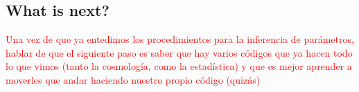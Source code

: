 \documentclass[onecolumn,           %
               showpacs,            %
               preprintnumbers,     %
               aps,                 %
               prl,          	    %
               letterpaper,             %
               superscriptaddress,      %
               nofootinbib,         %
               tightenlines,        %
               floats,floatfix      %
               ,usenatbib,
               ]{revtex4-1}
\begin{document}
\subsection{What is next?}

\textcolor{red}{Una vez de que ya entedimos los procedimientos para la inferencia de par\'ametros, hablar de que el siguiente paso es saber que hay varios c\'odigos que ya hacen todo lo que vimos (tanto la cosmolog\'ia, como la estad\'istica) y que es mejor aprender a moverles que andar haciendo nuestro propio código (quiz\'as)}





\end{document}
